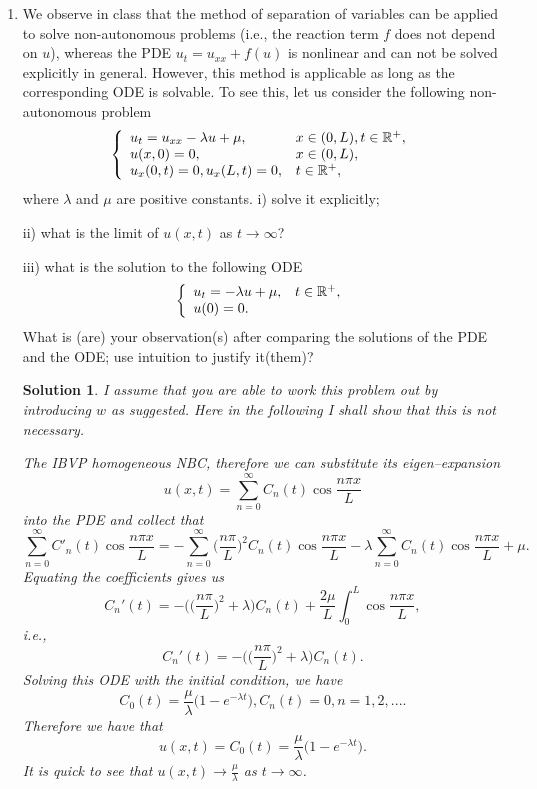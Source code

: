 \documentclass[6pt]{article}
\newtheorem{solution}{Solution}
\numberwithin{equation}{section}
\def\mathbb{\Bbb}
\begin{document}
\begin{enumerate}
\item  We observe in class that the method of separation of variables can be applied to solve non-autonomous problems (i.e., the reaction term $f$ does not depend on $u$), whereas the PDE $u_t=u_{xx}+f(u)$ is nonlinear and can not be solved explicitly in general.  However, this method is applicable as long as the corresponding ODE is solvable.  To see this, let us consider the following non-autonomous problem
\begin{equation}\label{5}
\left\{
\begin{array}{ll}
u_t=u_{xx}-\lambda u+\mu,& x\in(0,L),t\in\mathbb R^+,\\
u(x,0)=0,&x\in(0,L),\\
u_x(0,t)=0, u_x(L,t)=0, &t\in\mathbb R^+,
\end{array}
\right.
\end{equation}
where $\lambda$ and $\mu$ are positive constants.
i) solve it explicitly;

ii) what is the limit of $u(x,t)$ as $t\rightarrow \infty$?

iii) what is the solution to the following ODE
\begin{equation}
\left\{
\begin{array}{ll}
u_t=-\lambda u+\mu,&t\in\mathbb R^+,\\
u(0)=0.&
\end{array}
\right.
\end{equation}
What is (are) your observation(s) after comparing the solutions of the PDE and the ODE; use intuition to justify it(them)?
\begin{solution}
I assume that you are able to work this problem out by introducing $w$ as suggested.  Here in the following I shall show that this is not necessary.

The IBVP homogeneous NBC, therefore we can substitute its eigen--expansion
\[u(x,t)=\sum_{n=0}^\infty C_n(t)\cos \frac{n\pi x}{L}\]
into the PDE and collect that
\[\sum_{n=0}^\infty C'_n(t)\cos \frac{n\pi x}{L}=-\sum_{n=0}^\infty \Big(\frac{n\pi}{L}\Big)^2C_n(t)\cos \frac{n\pi x}{L}-\lambda \sum_{n=0}^\infty C_n(t)\cos \frac{n\pi x}{L}+\mu.\]
Equating the coefficients gives us
\[C_n'(t)=-\Big(\big(\frac{n\pi}{L}\big)^2+\lambda\Big)C_n(t)+\frac{2\mu}{L}\int_0^L \cos \frac{n\pi x}{L},\]
i.e.,
\[C_n'(t)=-\Big(\big(\frac{n\pi}{L}\big)^2+\lambda\Big)C_n(t).\]
Solving this ODE with the initial condition, we have
\[C_0(t)=\frac{\mu}{\lambda}\big(1-e^{-\lambda t}\big), C_n(t)=0,n=1,2,....\]
Therefore we have that
\[u(x,t)=C_0(t)=\frac{\mu}{\lambda}\big(1-e^{-\lambda t}\big).\]
It is quick to see that $u(x,t)\rightarrow \frac{\mu}{\lambda}$ as $t\rightarrow\infty$.


\end{solution}
\end{enumerate}
\end{document}
